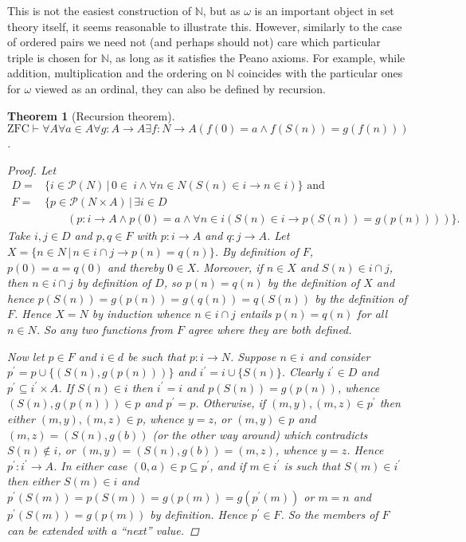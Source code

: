 \documentclass{scrartcl}
\theoremstyle{definition}
\theoremstyle{plain}
\newtheorem{Thm}{Theorem}
\theoremstyle{remark}
\newcommand{\N}{\ensuremath{\mathbb{N}}}
\newcommand{\ZFC}{\ensuremath{\mathrm{ZFC}}}
\newcommand{\limp}{\rightarrow}
\newcommand{\Pow}{\mathcal{P}}
\newcommand{\sep}{\,|\,}
\begin{document}
This is not the easiest construction of $\N$, but as $\omega$ is an important object in set theory itself, it seems reasonable to illustrate this. However, similarly to the case of ordered pairs we need not (and perhaps should not) care which particular triple is chosen for $\N$, as long as it satisfies the Peano axioms. For example, while addition, multiplication and the ordering on $\N$ coincides with the particular ones for $\omega$ viewed as an ordinal, they can also be defined by recursion.

\begin{Thm}[Recursion theorem]
  $\ZFC \vdash \forall A \forall a \in A \forall g : A \longrightarrow A \exists f : N \longrightarrow A (f(0) = a \land f(S(n)) = g(f(n)))$.
  \begin{proof}
    Let
    \begin{align*}
      D = &\{i \in \Pow(N) \sep 0 \in\ i \land \forall n \in N (S(n) \in i \limp n \in i)\}\text{ and}\\
      F = &\{p \in \Pow(N \times A) \sep \exists i \in D\\
      &\qquad (p : i \longrightarrow A \land p(0) = a \land \forall n \in i (S(n) \in i \limp p(S(n)) = g(p(n))))\}\mbox{.}
    \end{align*}
    Take $i,j \in D$ and $p,q \in F$ with $p : i \longrightarrow A$ and $q : j \longrightarrow A$. Let $X = \{n \in N \sep n \in i \cap j \limp p(n) = q(n)\}$. By definition of $F$, $p(0) = a = q(0)$ and thereby $0 \in X$. Moreover, if $n \in X$ and $S(n) \in i \cap j$, then $n \in i \cap j$ by definition of $D$, so $p(n) = q(n)$ by the definition of $X$ and hence $p(S(n)) = g(p(n)) = g(q(n)) = q(S(n))$ by the definition of $F$. Hence $X = N$ by induction whence $n \in i \cap j$ entails $p(n) = q(n)$ for all $n \in N$. So any two functions from $F$ agree where they are both defined.

    Now let $p \in F$ and $i \in d$ be such that $p : i \longrightarrow N$. Suppose $n \in i$ and consider $p^{\prime} = p \cup \{(S(n),g(p(n)))\}$ and $i^{\prime} = i \cup \{S(n)\}$. Clearly $i^{\prime} \in D$ and $p^{\prime} \subseteq i^{\prime} \times A$. If $S(n) \in i$ then $i^{\prime} = i$ and $p(S(n)) = g(p(n))$, whence $(S(n),g(p(n))) \in p$ and $p^{\prime} = p$. Otherwise, if $(m,y),(m,z) \in p^{\prime}$ then either $(m,y),(m,z) \in p$, whence $y = z$, or $(m,y) \in p$ and $(m,z) = (S(n),g(b))$ (or the other way around) which contradicts $S(n) \not\in i$, or $(m,y) = (S(n),g(b)) = (m,z)$, whence $y = z$. Hence $p^{\prime} : i^{\prime} \longrightarrow A$. In either case $(0,a) \in p \subseteq p^{\prime}$, and if $m \in i^{\prime}$ is such that $S(m) \in i^{\prime}$ then either $S(m) \in i$ and $p^{\prime}(S(m)) = p(S(m)) = g(p(m)) = g(p^{\prime}(m))$ or $m = n$ and $p^{\prime}(S(m)) = g(p(m))$ by definition. Hence $p^{\prime} \in F$. So the members of $F$ can be extended with a ``next'' value.


\end{proof}
\end{Thm}
\end{document}
